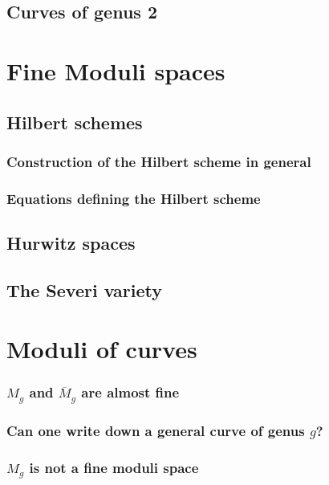 \section{Curves of genus 2}\label{genus 2 section}


\chapter{Fine Moduli spaces} 
\label{Moduli chapter}\label{ModuliChapter}
\section{Hilbert schemes}\label{hilbert scheme section}
\begin{theorem}\label{tangent space of Hilb}
\subsection{Construction of the Hilbert scheme in general}\label{hilb construction}
\subsection{Equations defining the Hilbert scheme}\label{eqns of Hilb}
\section{Hurwitz spaces}\label{Hurwitz spaces}
\section{The Severi variety}\label{severi variety}

\chapter{Moduli of curves} 
\label{CurvesModuli chapter}\label{CurvesModuliChapter}
\subsection{$M_g$ and $\overline M_g$ are almost fine}\label{almost fine}
\subsection{Can one write down a general curve of genus $g$?}\label{mgunirational}
\subsection{$M_g$ is not a fine moduli space}\label{coarse moduli}


\end{theorem}
